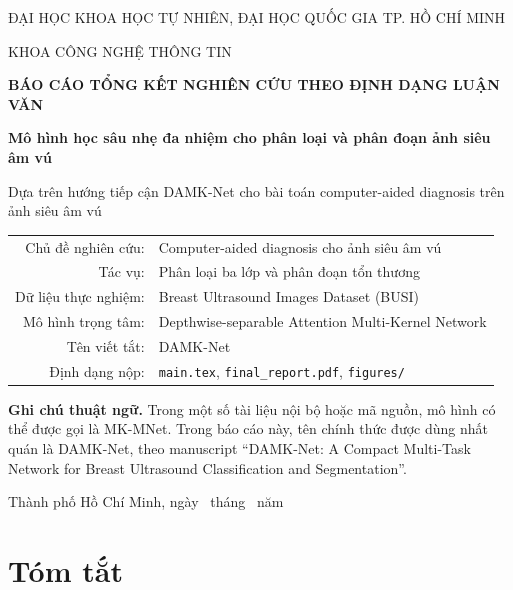 \documentclass[12pt,a4paper,oneside]{report}
\newcommand{\projecttitle}{Mô hình học sâu nhẹ đa nhiệm cho phân loại và phân đoạn ảnh siêu âm vú}
\newcommand{\modelname}{DAMK-Net}
\newcommand{\code}[1]{\texttt{#1}}
\begin{document}
\begin{titlepage}
\centering
{\large ĐẠI HỌC KHOA HỌC TỰ NHIÊN, ĐẠI HỌC QUỐC GIA TP. HỒ CHÍ MINH\par}
{\large KHOA CÔNG NGHỆ THÔNG TIN\par}
\vspace{2.0cm}
{\Large\bfseries BÁO CÁO TỔNG KẾT NGHIÊN CỨU THEO ĐỊNH DẠNG LUẬN VĂN\par}
\vspace{0.8cm}
{\LARGE\bfseries \projecttitle\par}
\vspace{0.8cm}
{\large Dựa trên hướng tiếp cận \modelname{} cho bài toán computer-aided diagnosis trên ảnh siêu âm vú\par}
\vspace{1.6cm}

\begin{tabular}{rl}
Chủ đề nghiên cứu: & Computer-aided diagnosis cho ảnh siêu âm vú \\
Tác vụ: & Phân loại ba lớp và phân đoạn tổn thương \\
Dữ liệu thực nghiệm: & Breast Ultrasound Images Dataset (BUSI) \\
Mô hình trọng tâm: & Depthwise-separable Attention Multi-Kernel Network \\
Tên viết tắt: & \modelname{} \\
Định dạng nộp: & \code{main.tex}, \code{final\_report.pdf}, \code{figures/}
\end{tabular}

\vfill
\begin{flushleft}
\textbf{Ghi chú thuật ngữ.} Trong một số tài liệu nội bộ hoặc mã nguồn, mô hình có thể được gọi là MK-MNet. Trong báo cáo này, tên chính thức được dùng nhất quán là \modelname{}, theo manuscript ``DAMK-Net: A Compact Multi-Task Network for Breast Ultrasound Classification and Segmentation''.
\end{flushleft}
\vfill
{\large Thành phố Hồ Chí Minh, ngày \number\day\ tháng \number\month\ năm \number\year\par}
\end{titlepage}


\chapter*{Tóm tắt}
\end{document}
